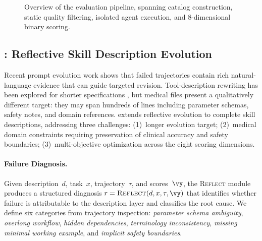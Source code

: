 \begin{figure}[!t]
\caption{Overview of the \medskillbench evaluation pipeline, spanning catalog construction, static quality filtering, isolated agent execution, and 8-dimensional binary scoring.}
\label{fig:pipeline}
\end{figure}


\subsection{\gepamed: Reflective Skill Description Evolution}
\label{subsec:gepa}

Recent prompt evolution work \citep{gepa2025} shows that failed trajectories contain rich natural-language evidence that can guide targeted revision.
Tool-description rewriting has been explored for shorter specifications \citep{easytool2024,play2prompt2025,tracefree2026}, but medical \skillmd files present a qualitatively different target: they may span hundreds of lines including parameter schemas, safety notes, and domain references.
\gepamed extends reflective evolution to complete skill descriptions, addressing three challenges:
(1)~longer evolution target;
(2)~medical domain constraints requiring preservation of clinical accuracy and safety boundaries;
(3)~multi-objective optimization across the eight scoring dimensions.

\paragraph{Failure Diagnosis.}
Given description~$d$, task~$x$, trajectory~$\tau$, and scores~$\vy$, the \textsc{Reflect} module produces a structured diagnosis $r = \textsc{Reflect}(d, x, \tau, \vy)$ that identifies whether failure is attributable to the description layer and classifies the root cause.
We define six categories from trajectory inspection:
\emph{parameter schema ambiguity},
\emph{overlong workflow},
\emph{hidden dependencies},
\emph{terminology inconsistency},
\emph{missing minimal working example}, and
\emph{implicit safety boundaries}.

